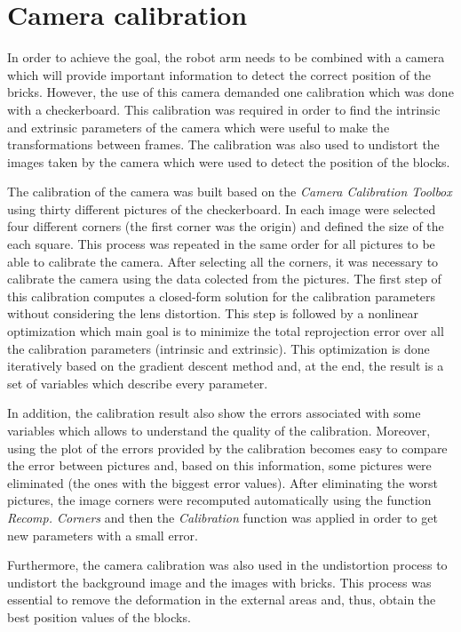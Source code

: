 \chapter{Camera calibration}\label{ch:calibration}

In order to achieve the goal, the robot arm needs to be combined with a camera which will provide important information to detect the correct position of the bricks. However, the use of this camera demanded one calibration which was done with a checkerboard. This calibration was required in order to find the intrinsic and extrinsic parameters of the camera which were useful to make the transformations between frames. The calibration was also used to undistort the images taken by the camera which were used to detect the position of the blocks.

The calibration of the camera was built based on the \textit{Camera Calibration Toolbox} using thirty different pictures of the checkerboard. In each image were selected four different corners (the first corner was the origin) and defined the size of the each square. This process was repeated in the same order for all pictures to be able to calibrate the camera. After selecting all the corners, it was necessary to calibrate the camera using the data colected from the pictures. The first step of this calibration computes a closed-form solution for the calibration parameters without considering the lens distortion. This step is followed by a nonlinear optimization which main goal is to minimize the total reprojection error over all the calibration parameters (intrinsic and extrinsic). This optimization is done iteratively based on the gradient descent method and, at the end, the result is a set of variables which describe every parameter. 

In addition, the calibration result also show the errors associated with some variables which allows to understand the quality of the calibration. Moreover, using the plot of the errors provided by the calibration becomes easy to compare the error between pictures and, based on this information, some pictures were eliminated (the ones with the biggest error values). After eliminating the worst pictures, the image corners were recomputed automatically using the function \textit{Recomp. Corners} and then the \textit{Calibration} function was applied in order to get new parameters with a small error.

Furthermore, the camera calibration was also used in the undistortion process to undistort the background image and the images with bricks. This process was essential to remove the deformation in the external areas and, thus, obtain the best position values of the blocks.

